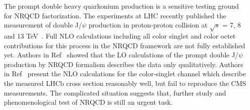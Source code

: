 \documentclass[aps,prc,preprint,superscriptaddress,showpacs,showkeys,amsmath]{revtex4-1}
\begin{document}
\begin{enumerate}
{   The prompt double heavy quarkonium production is a sensitive testing 
   ground for NRQCD factorization. The experiments at LHC recently published 
   the measurement of double J/$\psi$ production in proton-proton collision at $ \sqrt{s} $ 
   = 7, 8 and 13 TeV~\cite{Aaij:2011yc,Khachatryan:2014iia,Aaboud:2016fzt,Aaij:2016bqq}. 
   Full NLO calculations including all color singlet and color octet contributions 
   for this process in the NRQCD framework are not fully established yet. 
   Authors in Ref~\cite{He:2015qya} showed that the LO calculations of the prompt double J/$\psi$ 
   production by NRQCD formalism describes the data only qualitatively.
   Authors in Ref~\cite{Sun:2014gca} present the NLO calculations for the color-singlet channel
   which describe the measured LHCb cross section reasonably well, but fail to reproduce the CMS 
   measurements. The complicated situation suggests that, further study and phenomenological test of NRQCD is still an 
   urgent task.



}





\end{enumerate}
 






\end{document}
